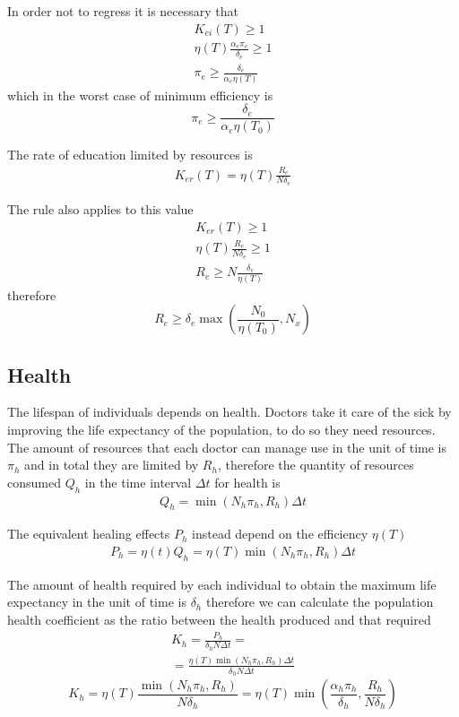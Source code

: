 \documentclass[a4paper,twoside]{article}
\begin{document}
In order not to regress it is necessary that
\begin{align*}
	K_{ei}(T) \ge 1
	\\
	\eta(T) \frac{\alpha_e \pi_e}{\delta_e} \ge 1
	\\
	\pi_e \ge \frac{\delta_e}{\alpha_e \eta(T)}
\end{align*}
which in the worst case of minimum efficiency is
\begin{equation}\label{eq:pie}
	\pi_e \ge \frac{\delta_e}{\alpha_e \eta(T_0)}
\end{equation}

The rate of education limited by resources is
\begin{align*}
	K_{er}(T) = \eta(T) \frac{R_e}{N \delta_e}
\end{align*}

The rule also applies to this value
\begin{align*}
	K_{er}(T) \ge 1
	\\
	\eta(T) \frac{R_e}{N \delta_e} \ge 1
	\\
	R_e \ge N \frac{\delta_e}{\eta(T)}
\end{align*}
therefore
\begin{equation}\label{eq:Re}
	R_e \ge \delta_e \max \left( \frac{N_0}{\eta(T_0)}, N_x \right)
\end{equation}

\subsection{Health}

The lifespan of individuals depends on health.
Doctors take it care of the sick by improving the life expectancy of the population, to do so they need resources.
The amount of resources that each doctor can manage use in the unit of time is $ \pi_h $ and in total they are limited by $ R_h $, therefore the
quantity of resources consumed $ Q_h $ in the time interval $\Delta t $ for health is
\begin{align*}
	Q_h = \min(N_h \pi_h, R_h) \Delta t
\end{align*}

The equivalent healing effects $ P_h $ instead depend on the efficiency $ \eta(T) $
\begin{align*}
	P_h = \eta(t) Q_h = \eta(T) \min(N_h \pi_h, R_h) \Delta t
\end{align*}

The amount of health required by each individual to obtain the maximum life expectancy in the unit of time is $ \delta_h $ therefore we can calculate the population health coefficient as the ratio between the health produced and that required
\begin{align*}
	K_h = \frac{P_h}{\delta_h N \Delta t} =
	\\
	= \frac{\eta(T) \min(N_h \pi_h, R_h) \Delta t}{\delta_h N \Delta t}
\end{align*}
\begin{equation}\label{eq:kh}
	K_h = \eta(T) \frac{\min \left( N_h \pi_h, R_h \right)}{N \delta_h}
	= \eta(T) \min \left( \frac{\alpha_h \pi_h}{\delta_h}, \frac{R_h}{N \delta_h} \right)
\end{equation}
\end{document}
